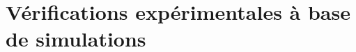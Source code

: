 \documentclass[12pt]{article}
\begin{document}
\begin{enumerate}
%
\end{enumerate}
\section{Vérifications expérimentales à base de simulations}
\end{document}
